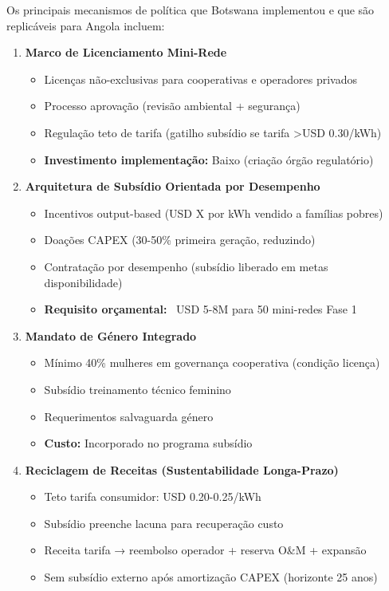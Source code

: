 \documentclass[12pt, a4paper]{article}
\begin{document}
Os principais mecanismos de política que Botswana implementou e que são replicáveis para Angola incluem:

\begin{enumerate}
\item \textbf{Marco de Licenciamento Mini-Rede}
   \begin{itemize}
   \item Licenças não-exclusivas para cooperativas e operadores privados
   \item Processo aprovação (revisão ambiental + segurança)
   \item Regulação teto de tarifa (gatilho subsídio se tarifa >USD 0.30/kWh)
   \item \textbf{Investimento implementação:} Baixo (criação órgão regulatório)
   \end{itemize}

\item \textbf{Arquitetura de Subsídio Orientada por Desempenho}
   \begin{itemize}
   \item Incentivos output-based (USD X por kWh vendido a famílias pobres)
   \item Doações CAPEX (30-50\% primeira geração, reduzindo)
   \item Contratação por desempenho (subsídio liberado em metas disponibilidade)
   \item \textbf{Requisito orçamental:} ~USD 5-8M para 50 mini-redes Fase 1
   \end{itemize}

\item \textbf{Mandato de Género Integrado}
   \begin{itemize}
   \item Mínimo 40\% mulheres em governança cooperativa (condição licença)
   \item Subsídio treinamento técnico feminino
   \item Requerimentos salvaguarda género
   \item \textbf{Custo:} Incorporado no programa subsídio
   \end{itemize}

\item \textbf{Reciclagem de Receitas (Sustentabilidade Longa-Prazo)}
   \begin{itemize}
   \item Teto tarifa consumidor: USD 0.20-0.25/kWh
   \item Subsídio preenche lacuna para recuperação custo
   \item Receita tarifa → reembolso operador + reserva O\&M + expansão
   \item Sem subsídio externo após amortização CAPEX (horizonte 25 anos)
   \end{itemize}
\end{enumerate}
\end{document}

